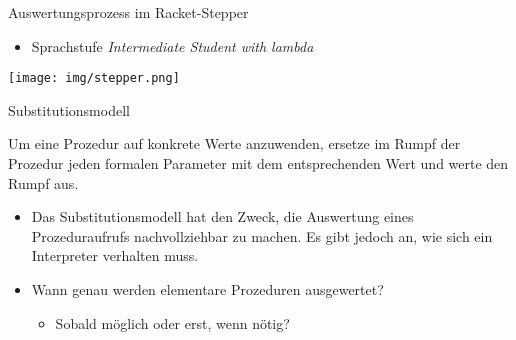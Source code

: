 \begin{frame}[t,fragile]{Auswertungsprozess im Racket-Stepper}
	\begin{itemize}
		\item Sprachstufe \textit{Intermediate Student with lambda}
	\end{itemize}
	\begin{center}
		\texttt{[image: img/stepper.png]}
	\end{center}
\end{frame}

\begin{frame}[t,fragile]{Substitutionsmodell}
	\begin{mybox}
		Um eine Prozedur auf konkrete Werte anzuwenden, ersetze im Rumpf der Prozedur jeden formalen Parameter mit dem entsprechenden Wert und werte den Rumpf aus.
	\end{mybox}
	
	\vspace*{0.5cm}
	
	 \pause
	\begin{itemize}
		\item {} Das Substitutionsmodell hat den Zweck, die Auswertung eines Prozeduraufrufs nachvollziehbar zu machen.
		Es gibt jedoch  an, wie sich ein Interpreter verhalten muss. \pause
		\item Wann genau werden elementare Prozeduren ausgewertet?
		\begin{itemize}
			\item Sobald möglich oder erst, wenn nötig?
		\end{itemize}
	\end{itemize}
\end{frame}

